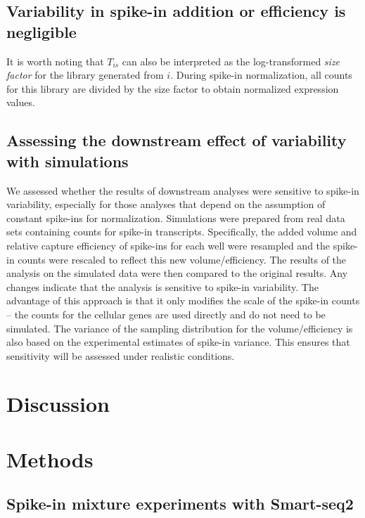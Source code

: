 \documentclass{article}
\begin{document}
\subsection{Variability in spike-in addition or efficiency is negligible}

It is worth noting that $T_{is}$ can also be interpreted as the log-transformed \textit{size factor} for the library generated from $i$.
During spike-in normalization, all counts for this library are divided by the size factor to obtain normalized expression values.


\subsection{Assessing the downstream effect of variability with simulations}
We assessed whether the results of downstream analyses were sensitive to spike-in variability, especially for those analyses that depend on the assumption of constant spike-ins for normalization.
Simulations were prepared from real data sets containing counts for spike-in transcripts.
Specifically, the added volume and relative capture efficiency of spike-ins for each well were resampled and the spike-in counts were rescaled to reflect this new volume/efficiency.
The results of the analysis on the simulated data were then compared to the original results.
Any changes indicate that the analysis is sensitive to spike-in variability.
The advantage of this approach is that it only modifies the scale of the spike-in counts -- the counts for the cellular genes are used directly and do not need to be simulated.
The variance of the sampling distribution for the volume/efficiency is also based on the experimental estimates of spike-in variance.
This ensures that sensitivity will be assessed under realistic conditions. 

\section{Discussion}

\section{Methods}

\subsection{Spike-in mixture experiments with Smart-seq2}
\end{document}
